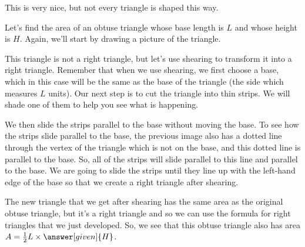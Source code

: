 \documentclass{ximera}
\begin{document}
This is very nice, but not every triangle is shaped this way.
\begin{example}
Let's find the area of an obtuse triangle whose base length is $L$ and whose height is $H$. Again, we'll start by drawing a picture of the triangle.
\begin{image}\end{image}

This triangle is not a right triangle, but let's use shearing to transform it into a right triangle. Remember that when we use shearing, we first choose a base, which in this case will be the same as the base of the triangle (the side which measures $L$ units). Our next step is to cut the triangle into thin strips. We will shade one of them to help you see what is happening.
\begin{image}\end{image}
We then slide the strips parallel to the base without moving the base. To see how the strips slide parallel to the base, the previous image also has a dotted line through the vertex of the triangle which is not on the base, and this dotted line is parallel to the base. So, all of the strips will slide parallel to this line and parallel to the base. We are going to slide the strips until they line up with the left-hand edge of the base so that we create a right triangle after shearing.
\begin{image}\end{image}
The new triangle that we get after shearing has the same area as the original obtuse triangle, but it's a right triangle and so we can use the formula for right triangles that we just developed. So, we see that this obtuse triangle also has area $A = \frac12 L \times \answer[given]{H}$.

\end{example}
\end{document}
